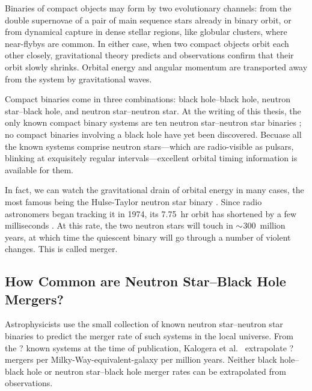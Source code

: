 Binaries of compact objects may form by two evolutionary channels: from the
double supernovae of a pair of main sequence stars already in binary orbit,
or from dynamical capture in dense stellar regions, like globular clusters,
where near-flybys are common.
In either case, when two compact objects orbit each other closely, gravitational
theory predicts \citep{eins1916-integrate_field_eqns,eins1918-grav_waves}
and observations confirm \citep{will2014-review}
that their orbit slowly shrinks. Orbital energy and angular momentum
are transported away from the system by gravitational waves.

Compact binaries come in three combinations: black hole--black hole, neutron
star--black hole, and neutron star--neutron star. At the writing of this thesis,
the only known compact binary systems are ten neutron star--neutron star
binaries \citep{post2014-evolution_compact_binaries}; no compact binaries
involving a black hole have yet been discovered.
Becuase all the known systems comprise neutron stars---which are radio-visible as
pulsars, blinking at exquisitely regular intervals---excellent orbital timing
information is available for them.

In fact, we can watch the gravitational drain of orbital energy in many
cases, the most famous being the Hulse-Taylor neutron star binary
\citep{huls1975-discovery}.
Since radio astronomers began tracking it in 1974, its 7.75~hr orbit has
shortened by a few milliseconds \citep{weis2010-hulse_taylor_timing}.
At this rate, the two neutron stars will touch in $\mathord{\sim}$300~million years,
at which time the quiescent binary will go through a number of violent changes.
This is called merger.

\subsection{How Common are Neutron Star--Black Hole Mergers?}

Astrophysicists use the small collection of known neutron star--neutron star
binaries to predict the merger rate of such systems in the local universe.
From the ? known systems at the time of publication, Kalogera et al.\
\citeyearpar{kalo2004-bns_merger_rate, kalo2004-erratum} extrapolate ?
\todo{fill in}
mergers per Milky-Way-equivalent-galaxy per million years.
Neither black hole--black hole or neutron star--black hole merger rates can
be extrapolated from observations.

